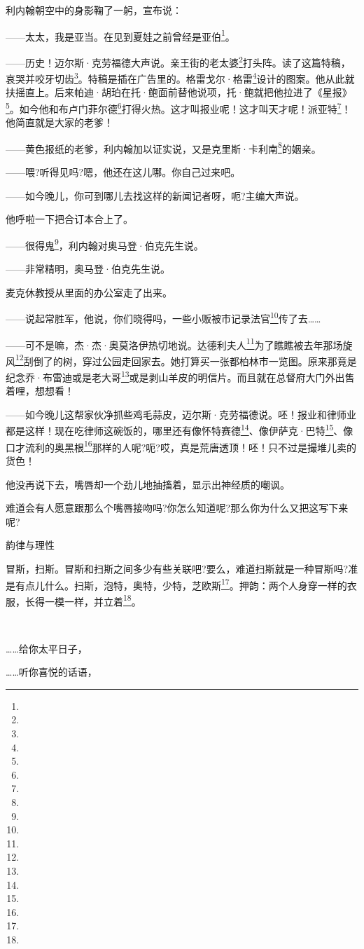 \par 利内翰朝空中的身影鞠了一躬，宣布说：
\par ——太太，我是亚当。在见到夏娃之前曾经是亚伯\footnote{}。
\par ——历史！迈尔斯·克劳福德大声说。亲王街的老太婆\footnote{}打头阵。读了这篇特稿，哀哭并咬牙切齿\footnote{}。特稿是插在广告里的。格雷戈尔·格雷\footnote{}设计的图案。他从此就扶摇直上。后来帕迪·胡珀在托·鲍面前替他说项，托·鲍就把他拉进了《星报》\footnote{}。如今他和布卢门菲尔德\footnote{}打得火热。这才叫报业呢！这才叫天才呢！派亚特\footnote{}！他简直就是大家的老爹！
\par ——黄色报纸的老爹，利内翰加以证实说，又是克里斯·卡利南\footnote{}的姻亲。
\par ——喂?听得见吗?嗯，他还在这儿哪。你自己过来吧。
\par ——如今晚儿，你可到哪儿去找这样的新闻记者呀，呃?主编大声说。
\par 他呼啦一下把合订本合上了。
\par ——很得鬼\footnote{}，利内翰对奥马登·伯克先生说。
\par ——非常精明，奥马登·伯克先生说。
\par 麦克休教授从里面的办公室走了出来。
\par ——说起常胜军，他说，你们晓得吗，一些小贩被市记录法官\footnote{}传了去……
\par ——可不是嘛，杰·杰·奥莫洛伊热切地说。达德利夫人\footnote{}为了瞧瞧被去年那场旋风\footnote{}刮倒了的树，穿过公园走回家去。她打算买一张都柏林市一览图。原来那竟是纪念乔·布雷迪或是老大哥\footnote{}或是剥山羊皮的明信片。而且就在总督府大门外出售着哩，想想看！
\par ——如今晚儿这帮家伙净抓些鸡毛蒜皮，迈尔斯·克劳福德说。呸！报业和律师业都是这样！现在吃律师这碗饭的，哪里还有像怀特赛德\footnote{}、像伊萨克·巴特\footnote{}、像口才流利的奥黑根\footnote{}那样的人呢?呃?哎，真是荒唐透顶！呸！只不过是撮堆儿卖的货色！
\par 他没再说下去，嘴唇却一个劲儿地抽搐着，显示出神经质的嘲讽。
\par 难道会有人愿意跟那么个嘴唇接吻吗?你怎么知道呢?那么你为什么又把这写下来呢?
\par 韵律与理性
\par 冒斯，扫斯。冒斯和扫斯之间多少有些关联吧?要么，难道扫斯就是一种冒斯吗?准是有点儿什么。扫斯，泡特，奥特，少特，芝欧斯\footnote{}。押韵：两个人身穿一样的衣服，长得一模一样，并立着\footnote{}。
\par  
\par ……给你太平日子，
\par ……听你喜悦的话语，
